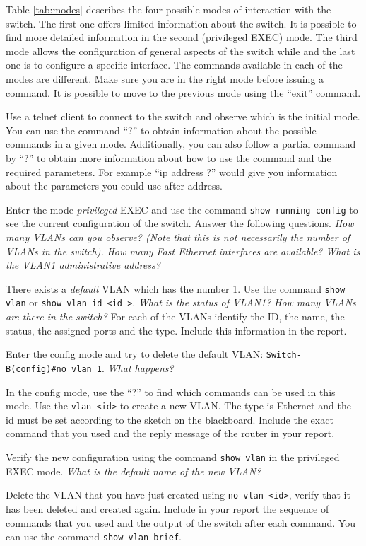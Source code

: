 Table \ref{tab:modes} describes the four possible modes of interaction with the switch.
The first one offers limited information about the switch.
It is possible to find more detailed information in the second (privileged EXEC) mode.
The third mode allows the configuration of general aspects of the switch while and the last one is to configure a specific interface.
The commands available in each of the modes are different.
Make sure you are in the right mode before issuing a command.
It is possible to move to the previous mode using the ``exit'' command.

Use a telnet client to connect to the switch and observe which is the initial mode.
You can use the command ``?'' to obtain information about the possible commands in a given mode.
Additionally, you can also follow a partial command by ``?'' to obtain more information about how to use the command and the required parameters.
For example ``ip address ?'' would give you information about the parameters you could use after address.

Enter the mode \emph{privileged} EXEC and use the command \texttt{show running-config} to see the current configuration of the switch.
Answer the following questions.
\emph{How many VLANs can you observe? (Note that this is not necessarily the number of VLANs in the switch).}
\emph{How many Fast Ethernet interfaces are available?}
\emph{What is the VLAN1 administrative address?}

There exists a \emph{default} VLAN which has the number 1.
Use the command \texttt{show vlan} or \texttt{show vlan id \textless id \textgreater}.
\emph{What is the status of VLAN1?}
\emph{How many VLANs are there in the switch?}
For each of the VLANs identify the ID, the name, the status, the assigned ports and the type.
Include this information in the report.

Enter the config mode and try to delete the default VLAN:
\texttt{Switch-B(config)\#no vlan 1}.
\emph{What happens?}

In the config mode, use the ``?'' to find which commands can be used in this mode.
Use the \texttt{vlan <id>} to create a new VLAN.
The type is Ethernet and the id must be set according to the sketch on the blackboard.
Include the exact command that you used and the reply message of the router in your report.

Verify the new configuration using the command \texttt{show vlan} in the privileged EXEC mode.
\emph{What is the default name of the new VLAN?}

Delete the VLAN that you have just created using \texttt{no vlan <id>}, verify that it has been deleted and created again.
Include in your report the sequence of commands that you used and the output of the switch after each command.
You can use the command \texttt{show vlan brief}.

